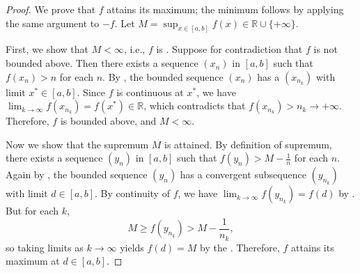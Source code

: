 \begin{proof}
    We prove that $f$ attains its maximum; the minimum follows by applying the same argument to $-f$. Let $M = \sup_{x \in [a,b]} f(x) \in \mathbb{R} \cup \{+\infty\}$.

    First, we show that $M < \infty$, i.e., $f$ is . Suppose for contradiction that $f$ is not bounded above. Then there exists a sequence $(x_n)$ in $[a,b]$ such that $f(x_n) > n$ for each $n$. By , the bounded sequence $(x_n)$ has a  $(x_{n_k})$ with limit $x^* \in [a,b]$. Since $f$ is continuous at $x^*$, we have $\lim_{k \to \infty} f(x_{n_k}) = f(x^*) \in \mathbb{R}$, which contradicts that $f(x_{n_k}) > n_k \to +\infty$. Therefore, $f$ is bounded above, and $M < \infty$.

    Now we show that the supremum $M$ is attained. By definition of supremum, there exists a sequence $(y_n)$ in $[a,b]$ such that $f(y_n) > M - \frac{1}{n}$ for each $n$. Again by , the bounded sequence $(y_n)$ has a convergent subsequence $(y_{n_k})$ with limit $d \in [a,b]$. By continuity of $f$, we have $\lim_{k \to \infty} f(y_{n_k}) = f(d)$ by . But for each $k$,
    $$M \geq f(y_{n_k}) > M - \frac{1}{n_k},$$
    so taking limits as $k \to \infty$ yields $f(d) = M$ by the . Therefore, $f$ attains its maximum at $d \in [a,b]$.
\end{proof}

